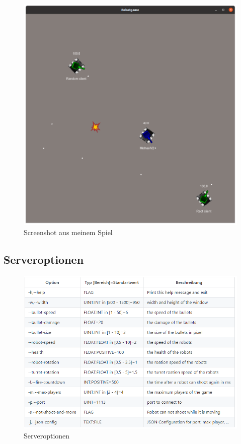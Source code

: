 \documentclass{article}
\begin{document}
\begin{figure}[h]
    \centering
    \includegraphics[width=\textwidth]{Robotgame}
    \caption{Screenshot aus meinem Spiel}
    \label{fig:screenshot}
\end{figure}

\pagebreak

\subsection{Serveroptionen}
\begin{figure}
    \centering
    \includegraphics[width=\textwidth]{Serveroptionen}
    \caption{Serveroptionen}
    \label{fig:screenshot}
\end{figure}
\end{document}
